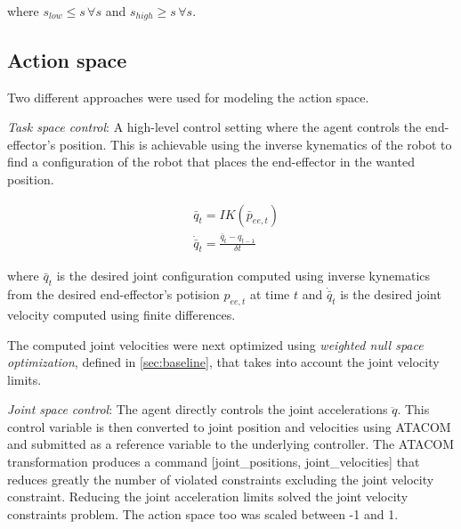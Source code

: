 where $s_{low} \le s \,\forall s$ and $s_{high} \ge s\,\forall s$.


\subsection{Action space}
\label{subseq:action_space}
Two different approaches were used for modeling the action space.

\textit{Task space control}:
A high-level control setting where the agent controls the end-effector's position. This is achievable using the inverse kynematics of the robot
to find a configuration of the robot that places the end-effector in the wanted position.

\begin{equation*}
    \begin{aligned}
        &\bar{q}_t = IK(\bar{p}_{ee,t}) \\
        &\dot{\bar{q}}_t = \frac{\bar{q}_t - q_{t-1}}{\delta t}
    \end{aligned}
\end{equation*}

where $\bar{q}_t$ is the desired joint configuration computed using inverse kynematics from the desired end-effector's potision $p_{ee,t}$ at time $t$ and
$\dot{\bar{q}}_t$ is the desired joint velocity computed using finite differences.

The computed joint velocities were next optimized using \textit{weighted null space optimization}, defined in \ref{sec:baseline}, that takes into account the joint velocity limits.

\textit{Joint space control}:
The agent directly controls the joint accelerations $\ddot{q}$. This control variable is then converted to joint position and velocities using ATACOM \cite{Atacom} and submitted as a reference variable
to the underlying controller. The ATACOM transformation produces a command [joint\_positions, joint\_velocities] that reduces greatly the number of violated constraints excluding the joint velocity constraint.
Reducing the joint acceleration limits solved the joint velocity constraints problem. The action space too was scaled between -1 and 1.

